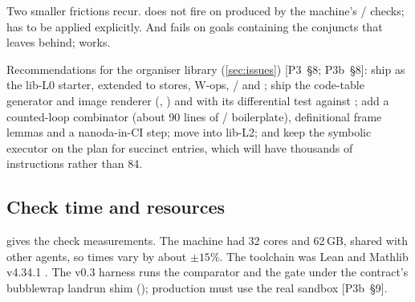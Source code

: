 Two smaller frictions recur.  does not fire on  produced by the machine's / checks;  has
to be applied explicitly. And  fails on goals containing the  conjuncts
that  leaves behind;  works.

Recommendations for the organiser library (\cref{sec:issues}) [P3~§8; P3b~§8]: ship 
as the \textsf{lib-L0} starter, extended to stores, W-ops, / and ; ship the
code-table generator and image renderer (, ) and
 with its differential test against ; add a counted-loop combinator (about 90
lines of / boilerplate), definitional frame lemmas and a nanoda-in-CI
step; move  into \textsf{lib-L2}; and keep the symbolic executor on the plan for
succinct entries, which will have thousands of instructions rather than 84.

\subsection{Check time and resources}\label{subsec:base-time}

 gives the check measurements. The machine had 32 cores and 62\,GB, shared with
other agents, so times vary by about $\pm15\%$. The toolchain was Lean and Mathlib v4.34.1
\cite{lean4340}. The v0.3 harness runs the comparator \cite{comparator,lean4export} and the gate under
the contract's bubblewrap landrun shim (); production must use the real
sandbox [P3b~§9].

